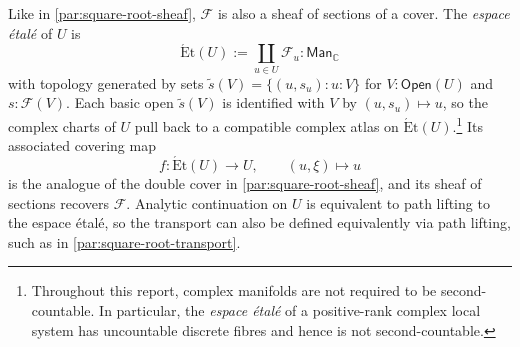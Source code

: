 \documentclass[11pt,letterpaper]{article}
\theoremstyle{numberfirstplain}
\numberwithin{equation}{theorem}
\theoremstyle{numberfirstupright}
\begin{document}
Like in \cref{par:square-root-sheaf}, $\mathcal F$ is also a sheaf of sections of a cover. 
The \textit{espace étalé} of $U$ is
$$\mathrm{\acute{E}t}(U):=\coprod_{u\in U}\mathcal F_u:\mathsf{Man}_{\mathbb C}$$
with topology generated by sets $\widetilde{s}(V)=\{(u,s_u):u:V\}$ for $V:\mathsf{Open}(U)$ and $s:\mathcal F(V)$. 
Each basic open $\widetilde{s}(V)$ is identified with $V$ by $(u,s_u)\mapsto u$, so the complex charts of $U$ pull back to a compatible complex atlas on $\mathrm{\acute{E}t}(U)$.\footnote{Throughout this report, complex manifolds are not required to be second-countable. In particular, the \textit{espace étalé} of a positive-rank complex local system has uncountable discrete fibres and hence is not second-countable.}
Its associated covering map
$$f:\mathrm{\acute{E}t}(U)\rightarrow U,\qquad (u,\xi)\mapsto u$$
is the analogue of the double cover in \cref{par:square-root-sheaf}, and its sheaf of sections recovers $\mathcal F$. Analytic continuation on $U$ is equivalent to path lifting to the espace étalé, so the transport can also be defined equivalently via path lifting, such as in \cref{par:square-root-transport}. 
\end{document}
